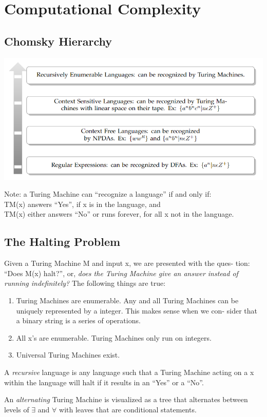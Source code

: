 \label{42-0523}
\section{Computational Complexity}

\subsection{Chomsky Hierarchy}
\begin{center}
    \includegraphics[scale=0.8]{figures/Chomsky_Hierarchy.png}
\end{center}
Note: a Turing Machine can ``recognize a language'' if and only if: \\
\quad TM(x) answers ``Yes'', if x is in the language, and \\
\quad TM(x) either answers ``No'' or runs forever, for all x not in the language.

\subsection{The Halting Problem}
Given a Turing Machine M and input x, we are presented with the ques-
tion: ``Does M(x) halt?'', or, \emph{does the Turing Machine give an answer instead of
running indeﬁnitely?} The following things are true:
\begin{enumerate}
    \item Turing Machines are enumerable. Any and all Turing Machines can
    be uniquely represented by a integer. This makes sense when we con-
    sider that a binary string is a series of operations.
    \item All x's are enumerable. Turing Machines only run on integers.
    \item Universal Turing Machines exist.
\end{enumerate}

\begin{definition}
    A \emph{recursive} language is any language such that a Turing Machine
    acting on a x within the language will halt if it results in an ``Yes'' or a ``No''.
\end{definition}
\begin{definition}
    An \emph{alternating} Turing Machine is visualized as a tree that alternates 
    between levels of $\exists$ and $\forall$ with leaves that are conditional statements.
\end{definition}

